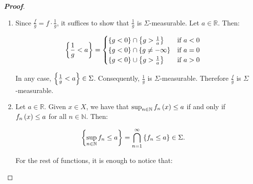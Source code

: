 \begin{proposition}
\begin{proof}[\rm\textbf{Proof}]
\begin{enumerate}
      \begin{equation}
        \set{f\cdot g<a}=\bigcup_{q\in\mathbb{Q},q>0}{\pr{\set{f<q}\cap\set{g<\frac{a}{q}}}}\in\Sigma.
      \end{equation}

      Therefore $f\cdot g$ is $\Sigma$-measurable. If $f$ and $g$ are $\Sigma$-measurable functions in general, we can see that:

      \begin{equation}
        f\cdot g=\pr{f^+-f^-}\cdot\pr{g^+-g^-}=f^+\cdot g^+-f^+\cdot g^--f^-\cdot g^++f^-\cdot g^-.
      \end{equation}

      In conclusion, $f\cdot g$ is $\Sigma$-measurable.
      \item Since $\frac{f}{g}=f\cdot\frac{1}{g}$, it suffices to show that $\frac{1}{g}$ is $\Sigma$-measurable. Let $a\in\mathbb{R}$. Then:
      
      \begin{equation}
        \left\{\frac{1}{g}<a\right\}=\begin{cases}
          \left\{g<0\right\}\cap\left\{g>\frac{1}{a}\right\} & \text{if $a<0$}\\
          \left\{g<0\right\}\cap\left\{g\neq-\infty\right\} & \text{if $a=0$}\\
          \left\{g<0\right\}\cup\left\{g>\frac{1}{a}\right\} & \text{if $a>0$}
        \end{cases}
      \end{equation}

      In any case, $\left\{\frac{1}{g}<a\right\}\in\Sigma$. Consequently, $\frac{1}{g}$ is $\Sigma$-measurable. Therefore $\frac{f}{g}$ is $\Sigma$-measurable.
      \item Let $a\in\mathbb{R}$. Given $x\in X$, we have that $\sup_{n\in\mathbb{N}}{f_n\left(x\right)}\leq a$ if and only if $f_n\left(x\right)\leq a$ for all $n\in\mathbb{N}$. Then:
      
      \begin{equation}
        \left\{\sup_{n\in\mathbb{N}}{f_n}\leq a\right\}=\bigcap_{n=1}^{\infty}{\left\{f_n\leq a\right\}}\in\Sigma.
      \end{equation}

      For the rest of functions, it is enough to notice that:


\end{enumerate}
\end{proof}
\end{proposition}

